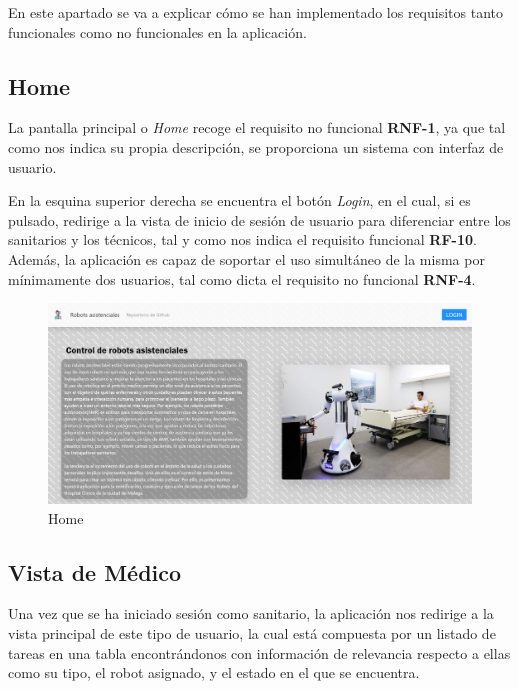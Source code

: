 En este apartado se va a explicar cómo se han implementado los requisitos tanto funcionales como no funcionales en la aplicación. 

\subsection{Home}

La pantalla principal o \textit{Home} recoge el requisito no funcional \textbf{RNF-1}, ya que tal como nos indica su propia descripción, se proporciona un sistema con interfaz de usuario.

En la esquina superior derecha se encuentra el botón \textit{Login}, en el cual, si es pulsado, redirige a la vista de inicio de sesión de usuario para diferenciar entre los sanitarios y los técnicos, tal y como nos indica el requisito funcional \textbf{RF-10}. Además, la aplicación es capaz de soportar el uso simultáneo de la misma por mínimamente dos usuarios, tal como dicta el requisito no funcional \textbf{RNF-4}.

\begin{figure}[H]
	\centering
	\includegraphics[width=1\textwidth]{images/Home.png}
	\caption{Home}
	\label{fig:UMLModel}
\end{figure}

\subsection{Vista de Médico}

Una vez que se ha iniciado sesión como sanitario, la aplicación nos redirige a la vista principal de este tipo de usuario, la cual está compuesta por un listado de tareas en una tabla encontrándonos con información de relevancia respecto a ellas como su tipo, el robot asignado, y el estado en el que se encuentra. 

